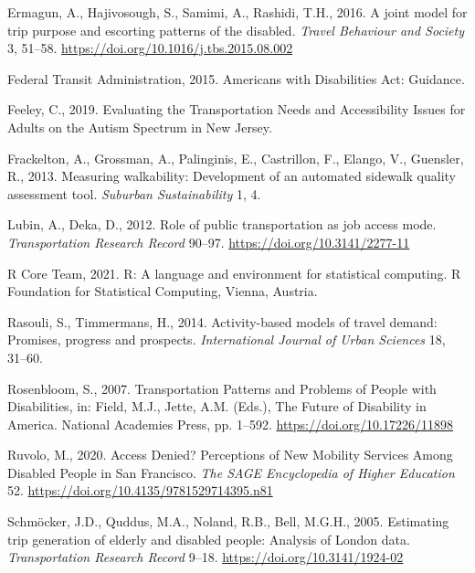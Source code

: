 \documentclass[3p, authoryear, review]{elsarticle} %
\newlength{\cslhangindent}
\newenvironment{CSLReferences}[2] %
 {%
  \setlength{\parindent}{0pt}
  \ifodd #1 \everypar{\setlength{\hangindent}{\cslhangindent}}\ignorespaces\fi
  \ifnum #2 > 0
  \setlength{\parskip}{#2\baselineskip}
  \fi
 }%
 {}
\begin{document}
\begin{CSLReferences}{1}{0}
\leavevmode{}%
Ermagun, A., Hajivosough, S., Samimi, A., Rashidi, T.H., 2016. {A joint model for trip purpose and escorting patterns of the disabled}. \emph{Travel Behaviour and Society} 3, 51--58. \url{https://doi.org/10.1016/j.tbs.2015.08.002}

\leavevmode{}%
Federal Transit Administration, 2015. {Americans with Disabilities Act: Guidance}.

\leavevmode{}%
Feeley, C., 2019. {Evaluating the Transportation Needs and Accessibility Issues for Adults on the Autism Spectrum in New Jersey}.

\leavevmode{}%
Frackelton, A., Grossman, A., Palinginis, E., Castrillon, F., Elango, V., Guensler, R., 2013. Measuring walkability: Development of an automated sidewalk quality assessment tool. \emph{Suburban Sustainability} 1, 4.

\leavevmode{}%
Lubin, A., Deka, D., 2012. {Role of public transportation as job access mode}. \emph{Transportation Research Record} 90--97. \url{https://doi.org/10.3141/2277-11}

\leavevmode{}%
R Core Team, 2021. R: A language and environment for statistical computing. R Foundation for Statistical Computing, Vienna, Austria.

\leavevmode{}%
Rasouli, S., Timmermans, H., 2014. Activity-based models of travel demand: Promises, progress and prospects. \emph{International Journal of Urban Sciences} 18, 31--60.

\leavevmode{}%
Rosenbloom, S., 2007. {Transportation Patterns and Problems of People with Disabilities}, in: Field, M.J., Jette, A.M. (Eds.), The Future of Disability in America. National Academies Press, pp. 1--592. \url{https://doi.org/10.17226/11898}

\leavevmode{}%
Ruvolo, M., 2020. {Access Denied? Perceptions of New Mobility Services Among Disabled People in San Francisco}. \emph{The SAGE Encyclopedia of Higher Education} 52. \url{https://doi.org/10.4135/9781529714395.n81}

\leavevmode{}%
Schmöcker, J.D., Quddus, M.A., Noland, R.B., Bell, M.G.H., 2005. {Estimating trip generation of elderly and disabled people: Analysis of London data}. \emph{Transportation Research Record} 9--18. \url{https://doi.org/10.3141/1924-02}


\end{CSLReferences}
\end{document}
